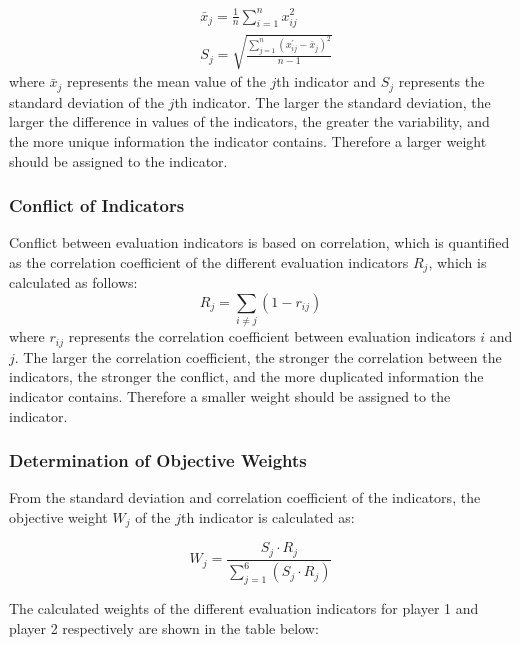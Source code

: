 \documentclass[12pt]{article}  %
\begin{document}
\begin{equation}
	\begin{aligned}
		& \bar{x}_j=\frac{1}{n} \sum_{i=1}^n x_{i j}^2 \\
		& S_j=\sqrt{\frac{\sum_{j=1}^n\left(x_{ij}^{\prime}-\bar{x}_j\right)^2}{n-1}}
	\end{aligned}
\end{equation}
where $\bar{x}_j$ represents the mean value of the $j$th indicator and $S_j$ represents the standard deviation of the $j$th indicator. The larger the standard deviation, the larger the difference in values of the indicators, the greater the variability, and the more unique information the indicator contains. Therefore a larger weight should be assigned to the indicator.

\subsubsection*{Conflict of Indicators}
Conflict between evaluation indicators is based on correlation, which is quantified as the correlation coefficient of the different evaluation indicators $R_j$, which is calculated as follows:
\begin{equation}
	R_j=\sum_{i \neq j}\left(1-r_{i j}\right)
\end{equation}
where $r_{ij}$ represents the correlation coefficient between evaluation indicators $i$ and $j$. The larger the correlation coefficient, the stronger the correlation between the indicators, the stronger the conflict, and the more duplicated information the indicator contains. Therefore a smaller weight should be assigned to the indicator.

\subsubsection*{Determination of Objective Weights}
From the standard deviation and correlation coefficient of the indicators, the objective weight $W_j$ of the $j$th indicator is calculated as:

\begin{equation}
	W_j=\frac{S_j \cdot R_j}{\sum_{j=1}^6\left(S_j \cdot R_j\right)}
\end{equation}

The calculated weights of the different evaluation indicators for player 1 and player 2 respectively are shown in the table below:
\end{document}
